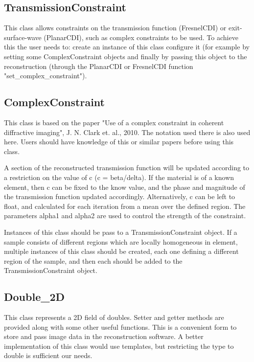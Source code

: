 \documentclass[]{nadia}
\begin{document}
\subsection{TransmissionConstraint}
This class allows constraints on the transmission function
(FresnelCDI) or exit-surface-wave (PlanarCDI), such as complex
constraints to be used. To achieve this the user needs to: create an
instance of this class configure it (for example by setting some
ComplexConstraint objects and finally by passing this object to the
reconstruction (through the PlanarCDI or FresnelCDI function
"set\_complex\_constraint").

\subsection{ComplexConstraint}

This class is based on the paper "Use of a complex constraint in
coherent diffractive imaging", J. N. Clark et. al., 2010. The notation
used there is also used here. Users should have knowledge of this or
similar papers before using this class.

A section of the reconstructed transmission function will be updated
according to a restriction on the value of c (c = beta/delta). If the
material is of a known element, then c can be fixed to the know value,
and the phase and magnitude of the transmission function updated
accordingly. Alternatively, c can be left to float, and calculated for
each iteration from a mean over the defined region. The parameters
alpha1 and alpha2 are used to control the strength of the constraint.

Instances of this class should be pass to a TransmissionConstraint
object. If a sample consists of different regions which are locally
homogeneous in element, multiple instances of this class should be
created, each one defining a different region of the sample, and then
each should be added to the TransmissionConstraint object.

\subsection{Double\_2D}
This class represents a 2D field of doubles. Setter and getter methods
are provided along with some other useful functions. This is a
convenient form to store and pass image data in the reconstruction
software. A better implementation of this class would use templates,
but restricting the type to double is sufficient our needs.
\end{document}
